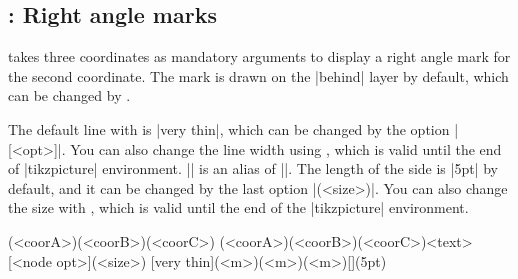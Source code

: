 



\subsection{\protect\cmd{\tzrightanglemark}: Right angle marks}
\label{ss:tzrightangle}

\icmd{\tzrightanglemark} takes three coordinates as mandatory arguments to display a right angle mark for the second coordinate. The mark is drawn on the |behind| layer by default, which can be changed by \icmd{\settzanglelayer}.

The default line with is |very thin|, which can be changed by the option |[<opt>]|. You can also change the line width using \icmd{\settzRAlinestyle}, which is valid until the end of |tikzpicture| environment.
|\settzRAlinestyle| is an alias of |\settzAAlinestyle|.
The length of the side is |5pt| by default, and it can be changed by the last option |(<size>)|.
You can also change the size with \icmd{\settzRAsize}, which is valid until the end of the |tikzpicture| environment.

\begin{tzdef}
\tzrightanglemark(<coorA>)(<coorB>)(<coorC>)
\tzrightanglemark[<opt>](<coorA>)(<coorB>)(<coorC>){<text>}[<node opt>](<size>)
 [very thin](<m>)(<m>)(<m>){}[](5pt)
\end{tzdef}

